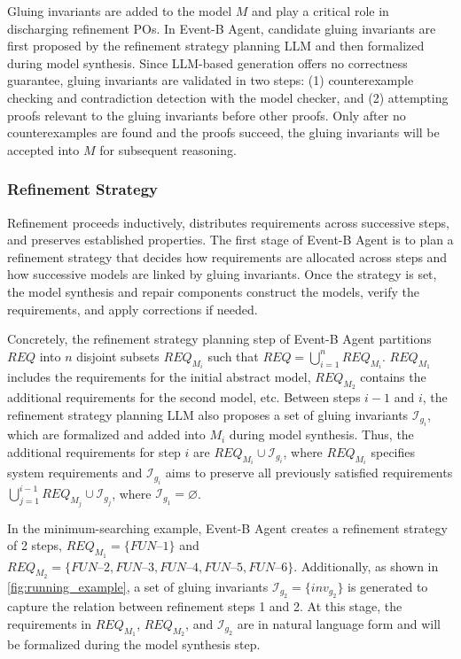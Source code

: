 Gluing invariants are added to the model $M$ and play a critical role in discharging refinement POs.
In Event-B Agent, candidate gluing invariants are first proposed by the refinement strategy planning LLM and then formalized during model synthesis.
Since LLM-based generation offers no correctness guarantee, gluing invariants are validated in two steps: (1) counterexample checking and contradiction detection with the model checker, and (2) attempting proofs relevant to the gluing invariants before other proofs.
Only after no counterexamples are found and the proofs succeed, the gluing invariants will be accepted into $M$ for subsequent reasoning.

\subsubsection{Refinement Strategy}

Refinement proceeds inductively, distributes requirements across successive steps, and preserves established properties.
The first stage of Event-B Agent is to plan a refinement strategy that decides how requirements are allocated across steps and how successive models are linked by gluing invariants.
Once the strategy is set, the model synthesis and repair components construct the models, verify the requirements, and apply corrections if needed.

Concretely, the refinement strategy planning step of Event-B Agent partitions $REQ$ into $n$ disjoint subsets $REQ_{M_i}$ such that $REQ=\bigcup_{i=1}^{n} REQ_{M_i}$.
$REQ_{M_1}$ includes the requirements for the initial abstract model, $REQ_{M_2}$ contains the additional requirements for the second model, etc.
Between steps $i-1$ and $i$, the refinement strategy planning LLM also proposes a set of gluing invariants $\mathcal{I}_{g_i}$, which are formalized and added into $M_i$ during model synthesis.
Thus, the additional requirements for step $i$ are $REQ_{M_i} \cup \mathcal{I}_{g_i}$, where $REQ_{M_i}$ specifies system requirements and $\mathcal{I}_{g_i}$ aims to preserve all previously satisfied requirements $\bigcup_{j=1}^{i-1} REQ_{M_j} \cup \mathcal{I}_{g_j}$, where $\mathcal{I}_{g_1}=\varnothing$.

In the minimum-searching example, Event-B Agent creates a refinement strategy of 2 steps, $REQ_{M_1} = \{FUN\text{--1}\}$ and $REQ_{M_2} = \{FUN\text{--2}, FUN\text{--3}, FUN\text{--4}, FUN\text{--5}, FUN\text{--6}\}$.
Additionally, as shown in \autoref{fig:running_example}, a set of gluing invariants $\mathcal{I}_{g_2} = \{inv_{g_2}\}$ is generated to capture the relation between refinement steps 1 and 2.
At this stage, the requirements in $REQ_{M_1}$, $REQ_{M_2}$, and $\mathcal{I}_{g_2}$ are in natural language form and will be formalized during the model synthesis step.

